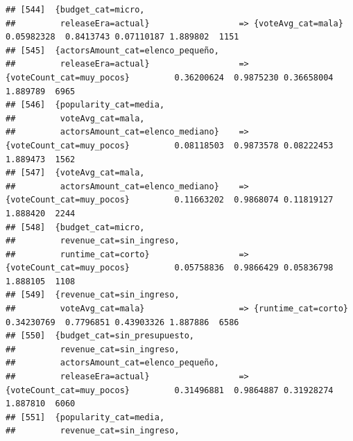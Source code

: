 \documentclass[
]{article}
\begin{document}
\begin{verbatim}
## [544]  {budget_cat=micro,                                                                                                       
##         releaseEra=actual}                  => {voteAvg_cat=mala}                0.05982328  0.8413743 0.07110187 1.889802  1151
## [545]  {actorsAmount_cat=elenco_pequeño,                                                                                        
##         releaseEra=actual}                  => {voteCount_cat=muy_pocos}         0.36200624  0.9875230 0.36658004 1.889789  6965
## [546]  {popularity_cat=media,                                                                                                   
##         voteAvg_cat=mala,                                                                                                       
##         actorsAmount_cat=elenco_mediano}    => {voteCount_cat=muy_pocos}         0.08118503  0.9873578 0.08222453 1.889473  1562
## [547]  {voteAvg_cat=mala,                                                                                                       
##         actorsAmount_cat=elenco_mediano}    => {voteCount_cat=muy_pocos}         0.11663202  0.9868074 0.11819127 1.888420  2244
## [548]  {budget_cat=micro,                                                                                                       
##         revenue_cat=sin_ingreso,                                                                                                
##         runtime_cat=corto}                  => {voteCount_cat=muy_pocos}         0.05758836  0.9866429 0.05836798 1.888105  1108
## [549]  {revenue_cat=sin_ingreso,                                                                                                
##         voteAvg_cat=mala}                   => {runtime_cat=corto}               0.34230769  0.7796851 0.43903326 1.887886  6586
## [550]  {budget_cat=sin_presupuesto,                                                                                             
##         revenue_cat=sin_ingreso,                                                                                                
##         actorsAmount_cat=elenco_pequeño,                                                                                        
##         releaseEra=actual}                  => {voteCount_cat=muy_pocos}         0.31496881  0.9864887 0.31928274 1.887810  6060
## [551]  {popularity_cat=media,                                                                                                   
##         revenue_cat=sin_ingreso,                                                                                                

\end{verbatim}
\end{document}
